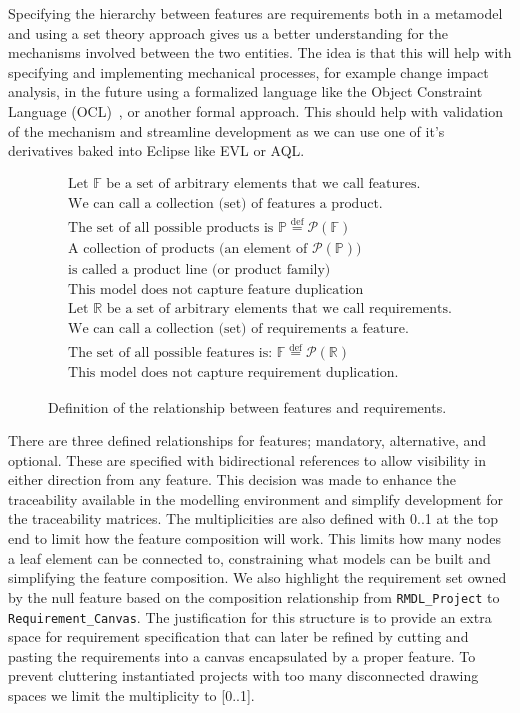 Specifying the hierarchy between features are requirements both in a metamodel and using a set theory approach gives us a better understanding for the mechanisms involved between the two entities. The idea is that this will help with specifying and implementing mechanical processes, for example change impact analysis, in the future using a formalized language like the Object Constraint Language (OCL)~\cite{richters2002ocl, cabot2012object}, or another formal approach. This should help with validation of the mechanism and streamline development as we can use one of it's derivatives baked into Eclipse like \ac{EVL} or \ac{AQL}.

\begin{figure}
	\begin{align}
		\text{Let } \mathbb{F} \text{ be a set of arbitrary elements that we call features.}\\
		\text{We can call a collection (set) of features a product.}\\
		\text{The set of all possible products is } \mathbb{P} \overset{\mathrm{def}}{=} \mathcal{P}(\mathbb{F})\\
		\text{A collection of products (an element of } \mathcal{P}(\mathbb{P})\text{)}\\
		\text{is called a product line (or product family)}\\
		\text{This model does not capture feature duplication}\\
		\text{Let } \mathbb{R} \text{ be a set of arbitrary elements that we call requirements.}\\
		\text{We can call a collection (set) of requirements a feature.}\\
		\text{The set of all possible features is: } \mathbb{F} \overset{\mathrm{def}}{=} \mathcal{P}(\mathbb{R})\\
		\text{This model does not capture requirement duplication.}
	\end{align}
	\caption{Definition of the relationship between features and requirements.}
	\label{fig:spec}
\end{figure}

There are three defined relationships for features; mandatory, alternative, and optional. These are specified with bidirectional references to allow visibility in either direction from any feature. This decision was made to enhance the traceability available in the modelling environment and simplify development for the traceability matrices. The multiplicities are also defined with 0..1 at the top end to limit how the feature composition will work. This limits how many nodes a leaf element can be connected to, constraining what models can be built and simplifying the feature composition. We also highlight the requirement set owned by the null feature based on the composition relationship from \texttt{RMDL\_Project} to \texttt{Requirement\_Canvas}. The justification for this structure is to provide an extra space for requirement specification that can later be refined by cutting and pasting the  requirements into a canvas encapsulated by a proper feature. To prevent cluttering instantiated projects with too many disconnected drawing spaces we limit the multiplicity to [0..1].

